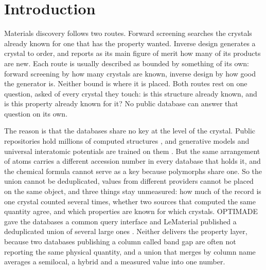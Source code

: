 \section{Introduction}

Materials discovery follows two routes. Forward screening searches the crystals
already known for one that has the property wanted. Inverse design generates a
crystal to order, and reports as its main figure of merit how many of its
products are new. Each route is usually described as bounded by something of its
own: forward screening by how many crystals are known, inverse design by how good
the generator is. Neither bound is where it is placed. Both routes rest on one
question, asked of every crystal they touch: is this structure already known,
and is this property already known for it? No public database can answer that
question on its own.

The reason is that the databases share no key at the level of the crystal. Public
repositories hold millions of computed structures
\cite{jain2013commentary,saal2013materials,curtarolo2012aflow,schmidt2022dataset,%
kirklin2015oqmd,choudhary2020jarvis,draxl2019nomad,talirz2020materials}, and
generative models and universal interatomic potentials are trained on them
\cite{xie2022crystal,zeni2025generative,merchant2023scaling,chen2022universal,%
deng2023chgnet,batatia2023foundation,yang2024mattersim,wood2025uma}. But the
same arrangement of atoms carries a different accession number in every database
that holds it, and the chemical formula cannot serve as a key because polymorphs
share one. So the union cannot be deduplicated, values from different providers
cannot be placed on the same object, and three things stay unmeasured: how much
of the record is one crystal counted several times, whether two sources that
computed the same quantity agree, and which properties are known for which
crystals. OPTIMADE gave the databases a common query interface
\cite{andersen2021optimade,evans2024developments} and LeMaterial published a
deduplicated union of several large ones \cite{ramlaoui2025lemat}. Neither
delivers the property layer, because two databases publishing a column called
band gap are often not reporting the same physical quantity, and a union that
merges by column name averages a semilocal, a hybrid and a measured value into
one number.


